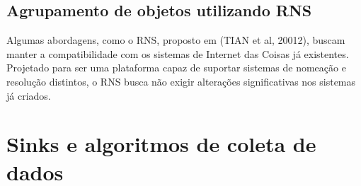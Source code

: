 \subsection{Agrupamento de objetos utilizando RNS}
	Algumas abordagens, como o RNS, proposto em (TIAN et al, 20012), buscam manter a compatibilidade com os sistemas de Internet das Coisas j\'{a} existentes. Projetado para ser uma plataforma capaz de suportar sistemas de nomea\c{c}\~{a}o e resolu\c{c}\~{a}o distintos, o RNS busca n\~{a}o exigir altera\c{c}\~{o}es significativas nos sistemas j\'{a} criados.


\section{Sinks e algoritmos de coleta de dados}

